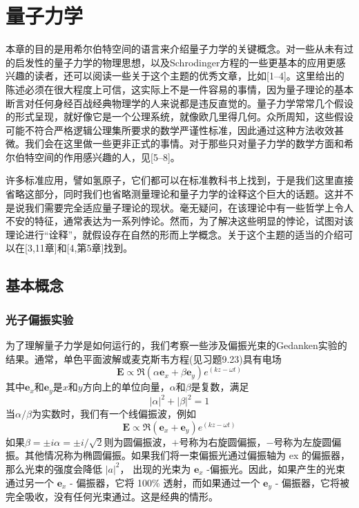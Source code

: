 \documentclass[hyperref,UTF8]{ctexbook}
\begin{document}
\chapter{量子力学}
本章的目的是用希尔伯特空间的语言来介绍量子力学的关键概念。对一些从未有过的启发性的量子力学的物理思想，以及Schrodinger方程的一些更基本的应用更感兴趣的读者，还可以阅读一些关于这个主题的优秀文章，比如[1–4]。这里给出的陈述必须在很大程度上可信，这实际上不是一件容易的事情，因为量子理论的基本断言对任何身经百战经典物理学的人来说都是违反直觉的。量子力学常常几个假设的形式呈现，就好像它是一个公理系统，就像欧几里得几何。众所周知，这些假设可能不符合严格逻辑公理集所要求的数学严谨性标准，因此通过这种方法收效甚微。我们会在这里做一些更非正式的事情。对于那些只对量子力学的数学方面和希尔伯特空间的作用感兴趣的人，见[5–8]。

许多标准应用，譬如氢原子，它们都可以在标准教科书上找到，于是我们这里直接省略这部分，同时我们也省略测量理论和量子力学的诠释这个巨大的话题。这并不是说我们需要完全适应量子理论的现状。毫无疑问，在该理论中有一些哲学上令人不安的特征，通常表达为一系列悖论。然而，为了解决这些明显的悖论，试图对该理论进行“诠释”，就假设存在自然的形而上学概念。关于这个主题的适当的介绍可以在[3,11章]和[4,第5章]找到。
\section{基本概念}
\subsection{光子偏振实验}
为了理解量子力学是如何运行的，我们考察一些涉及偏振光束的Gedanken实验的结果。通常，单色平面波解或麦克斯韦方程(见习题9.23)具有电场
\[\mathbf{E}\propto \Re(\alpha \mathbf{e}_x+\beta\mathbf{e}_y)e^{(kz-\omega t)}\]
其中\(\mathbf{e}_x\)和\(\mathbf{e}_y\)是\(x\)和\(y\)方向上的单位向量，\(\alpha \)和\(\beta\)是复数，满足
\[|\alpha|^2+|\beta|^2=1\]
当\(\alpha/\beta\)为实数时，我们有一个线偏振波，例如
\[\mathbf{E}\propto \Re(\mathbf{e}_x+\mathbf{e}_y)e^{(kz-\omega t)}\]
如果\(\beta =\pm i\alpha = \pm i/\sqrt{2}\)则为圆偏振波，\(+\)号称为右旋圆偏振，\(-\)号称为左旋圆偏振。其他情况称为椭圆偏振。如果我们将一束偏振光通过偏振轴为 ex 的偏振器，那么光束的强度会降低 $|a|^{2}$， 出现的光束为 $\mathbf{e}_{x}$ -偏振光。因此，如果产生的光束通过另一个 $\mathbf{e}_{x}$ - 偏振器，它将 100\% 透射，而如果通过一个 $\mathbf{e}_{y}$ - 偏振器，它将被完全吸收，没有任何光束通过。这是经典的情形。
\end{document}
